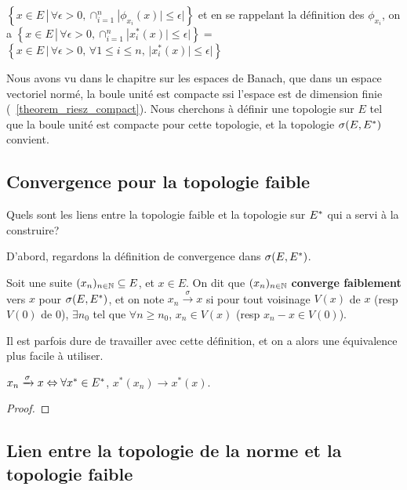 $\left\{ x \in E \, | \, \forall \epsilon > 0, \cap_{i = 1}^{n}|\phi_{x_{i}}(x)| \leq \epsilon| \right\}$
et en se rappelant la définition des $\phi_{x_{i}}$, on a
$\left\{ x \in E \, | \, \forall \epsilon > 0, \cap_{i = 1}^{n}|x_{i}^{*}(x)| \leq
\epsilon| \right\} = $
$\left\{ x \in E \, | \, \forall \epsilon > 0, \, \forall 1 \leq i \leq n, \, |x_{i}^{*}(x)| \leq \epsilon| \right\}$

Nous avons vu dans le chapitre sur les espaces de Banach, que dans un espace
vectoriel normé, la boule unité est compacte ssi l'espace est de dimension
finie (~\ref{theorem_riesz_compact}). Nous cherchons à définir une topologie sur
$E$ tel que la boule unité est compacte pour cette topologie, et la topologie
$\sigma(E, E^{*})$ convient.

\subsection{Convergence pour la topologie faible}
Quels sont les liens entre la topologie faible et la topologie sur $E^{*}$
qui a servi à la construire?

D'abord, regardons la définition de convergence dans $\sigma(E, E^{*})$.
\begin{definition}
	Soit une suite $(x_{n})_{n \in \mathbb{N}} \subseteq E$, et $x \in E$.
	On dit que $(x_{n})_{n \in \mathbb{N}}$ \textbf{converge faiblement} vers $x$
	pour $\sigma(E, E^{*})$, et on note $x_{n} \xrightarrow{\sigma} x$ si pour tout
	voisinage $V(x)$ de $x$ (resp $V(0)$ de $0$), $\exists n_{0}$ tel que
	$\forall n \geq n_{0}$, $x_{n} \in V(x)$ (resp $x_{n} - x \in V(0)$).
\end{definition}

Il est parfois dure de travailler avec cette définition, et on a alors une
équivalence plus facile à utiliser.

\begin{proposition}
	$x_{n} \xrightarrow{\sigma} x \Leftrightarrow \forall x^{*} \in E^{*}$,
	$x^{*}(x_{n}) \rightarrow x^{*}(x)$.
\end{proposition}

\ifdefined\outputproof
\begin{proof}

\end{proof}
\fi

\subsection{Lien entre la topologie de la norme et la topologie faible}

